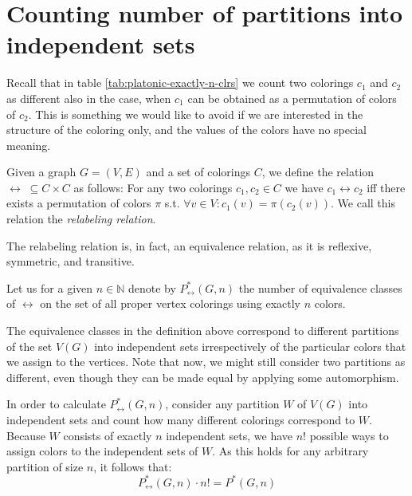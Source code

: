 \chapter{Counting number of partitions into independent sets}
\label{chap:num-partitions-into-indep-sets}

Recall that in table \ref{tab:platonic-exactly-n-clrs} we count two colorings $c_1$ and $c_2$ as different also in the case, when $c_1$ can be obtained as a permutation of colors of $c_2$. This is something we would like to avoid if we are interested in the structure of the coloring only, and the values of the colors have no special meaning.

\begin{defn}\label{dfn:relabeling-relation}
    Given a graph $G=(V,E)$ and a set of colorings $C$, we define the relation $\leftrightarrow \; \subseteq C \times C$ as follows: For any two colorings $c_1,c_2 \in C$ we have $c_1 \leftrightarrow c_2$ iff there exists a permutation of colors $\pi$ s.t. $\forall v \in V : c_1(v) = \pi(c_2(v))$. We call this relation the \emph{relabeling relation}.
\end{defn}

The relabeling relation is, in fact, an equivalence relation, as it is reflexive, symmetric, and transitive.

\begin{defn}
    Let us for a given $n \in \mathbb{N}$ denote by $P^*_{\leftrightarrow}(G,n)$ the number of equivalence classes of $\leftrightarrow$ on the set of all proper vertex colorings using exactly $n$ colors. 
\end{defn}

The equivalence classes in the definition above correspond to different partitions of the set $V(G)$ into independent sets irrespectively of the particular colors that we assign to the vertices. Note that now, we might still consider two partitions as different, even though they can be made equal by applying some automorphism.

In order to calculate $P^*_{\leftrightarrow}(G,n)$, consider any partition $W$ of $V(G)$ into independent sets and count how many different colorings correspond to $W$. Because $W$ consists of exactly $n$ independent sets, we have $n!$ possible ways to assign colors to the independent sets of $W$. As this holds for any arbitrary partition of size $n$, it follows that:
\begin{equation}\label{eqn:count-relabel-orbits}
    P^*_{\leftrightarrow}(G,n) \cdot n! = P^*(G,n)
\end{equation}

